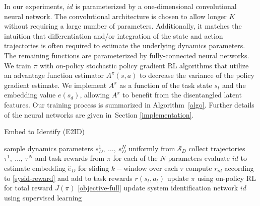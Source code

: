 \documentclass{article}
\newcommand{\E}{\mathbb{E}}
\newcommand{\cA}{\mathcal{A}}
\newcommand{\cH}{\mathcal{H}}
\newcommand{\cL}{\mathcal{L}}
\newcommand{\cS}{\mathcal{S}}
\newcommand{\embedfn}{e}
\newcommand{\idfn}{id}
\newcommand{\latent}{\cL}
\newcommand{\secref}[1]{Section \ref{#1}}
\begin{document}
In our experiments, $\idfn$ is parameterized by a one-dimensional convolutional neural network.
The convolutional architecture is chosen to allow longer $K$ without requiring a large number of parameters.
Additionally, it matches the intuition that differentiation and/or integration of the state and action trajectories
is often required to estimate the underlying dynamics parameters.
The remaining functions are parameterized by fully-connected neural networks.
We train $\pi$ with on-policy stochastic policy gradient RL algorithms
that utilize an advantage function estimator $A^\pi (s, a)$ to decrease the variance of the policy gradient estimate.
We implement $A^\pi$ as a function of the task state $s_t$ and the embedding value $\embedfn(s_d)$,
allowing $A^\pi$ to benefit from the disentangled latent features.
Our training process is summarized in Algorithm~\ref{algo}.
Further details of the neural networks are given in~\secref{implementation}.


\begin{algorithm}[hb]
\caption{Embed to Identify (E2ID)}
\begin{algorithmic}
  \State sample dynamics parameters $s_D^1,\ \dots,\ s_D^N$ uniformly from $\cS_D$
  \State collect trajectories $\tau^1,\ \dots,\ \tau^N$ and task rewards from $\pi$ for each of the $N$ parameters
  \State evaluate $\idfn$ to estimate embedding $\hat e_D$ for sliding $k-$window over each $\tau$
  \State compute $r_{\idfn}$ according to \eqref{sysid-reward} and add to task rewards $r(s_t,a_t)$
  \State update $\pi$ using on-policy RL for total reward $J(\pi)$ \eqref{objective-full}
  \State update system identification network $\idfn$ using supervised learning
\EndFor
\end{algorithmic}
\label{algo}
\end{algorithm}

\end{document}
